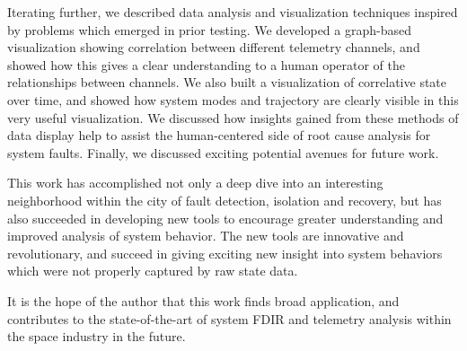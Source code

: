 Iterating further, we described data analysis and visualization techniques inspired by problems which emerged in prior testing. We developed a graph-based visualization showing correlation between different telemetry channels, and showed how this gives a clear understanding to a human operator of the relationships between channels. We also built a visualization of correlative state over time, and showed how system modes and trajectory are clearly visible in this very useful visualization. We discussed how insights gained from these methods of data display help to assist the human-centered side of root cause analysis for system faults. Finally, we discussed exciting potential avenues for future work.

This work has accomplished not only a deep dive into an interesting neighborhood within the city of fault detection, isolation and recovery, but has also succeeded in developing new tools to encourage greater understanding and improved analysis of system behavior. The new tools are innovative and revolutionary, and succeed in giving exciting new insight into system behaviors which were not properly captured by raw state data.

It is the hope of the author that this work finds broad application, and contributes to the state-of-the-art of system FDIR and telemetry analysis within the space industry in the future.